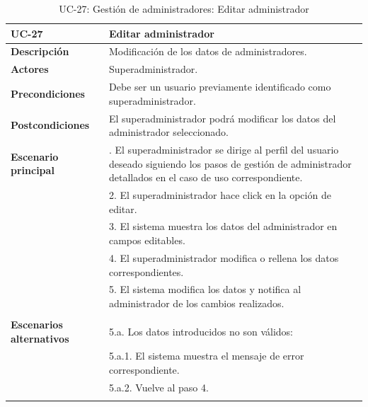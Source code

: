 \begin{table}[H]
  \begin{center}
    \begin{tabularx}{16.4cm}{|l|X|}
      \hline
      \textbf{UC-27} & \textbf{Editar administrador}\\
      \hline
      \textbf{Descripción} & Modificación de los datos de administradores.\\
      \hline
      \textbf{Actores} & Superadministrador.\\
      \hline
      \textbf{Precondiciones} & Debe ser un usuario previamente identificado como superadministrador.\\
      \hline
      \textbf{Postcondiciones} & El superadministrador podrá modificar los datos del administrador seleccionado.\\
      \hline
      \textbf{Escenario principal} & \smallskip 1. El superadministrador se dirige al perfil del usuario deseado siguiendo los pasos de gestión de administrador detallados en el caso de uso correspondiente.\\
      & 2. El superadministrador hace click en la opción de editar. \\
      & 3. El sistema muestra los datos del administrador en campos editables.\\
      & 4. El superadministrador modifica o rellena los datos correspondientes.\\
      & 5. El sistema modifica los datos y notifica al administrador de los cambios realizados.\\ 
      & \\
      \hline
      \textbf{Escenarios alternativos} & \smallskip 5.a. Los datos introducidos no son válidos:\\
      & \hspace{0.3cm} 5.a.1. El sistema muestra el mensaje de error correspondiente.\\
      & \hspace{0.3cm} 5.a.2. Vuelve al paso 4.\\
      & \\
      \hline
    \end{tabularx}
    \caption{UC-27: Gestión de administradores: Editar administrador}
    \label{tab:CU-editar-admin}
  \end{center}
\end{table}


